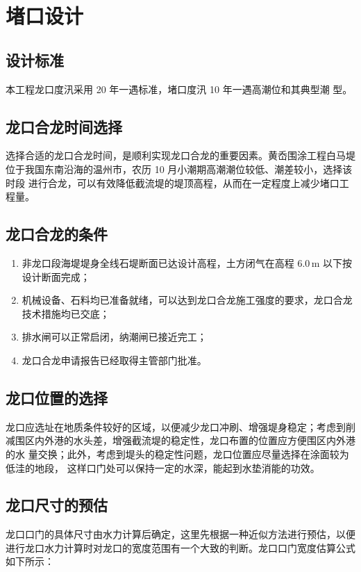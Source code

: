 \documentclass[UTF8, a4paper, 12pt]{ctexart} %
\begin{document}
\section{堵口设计}
\subsection{设计标准}
本工程龙口度汛采用 20 年一遇标准，堵口度汛 10 年一遇高潮位和其典型潮
型。
\subsection{龙口合龙时间选择}
选择合适的龙口合龙时间，是顺利实现龙口合龙的重要因素。黄岙围涂工程白马堤
位于我国东南沿海的温州市，农历 10 月小潮期高潮潮位较低、潮差较小，选择该时段
进行合龙，可以有效降低截流堤的堤顶高程，从而在一定程度上减少堵口工程量。



\subsection{龙口合龙的条件}

\begin{enumerate}
    \item 非龙口段海堤堤身全线石堤断面已达设计高程，土方闭气在高程 $6.0\,\text{m}$ 以下按设计断面完成；
    \item 机械设备、石料均已准备就绪，可以达到龙口合龙施工强度的要求，龙口合龙技术措施均已交底；
    \item 排水闸可以正常启闭，纳潮闸已接近完工；
    \item 龙口合龙申请报告已经取得主管部门批准。
\end{enumerate}

\subsection{龙口位置的选择}
龙口应选址在地质条件较好的区域，以便减少龙口冲刷、增强堤身稳定；考虑到削
减围区内外港的水头差，增强截流堤的稳定性，龙口布置的位置应方便围区内外港的水
量交换；此外，考虑到堤头的稳定性问题，龙口位置应尽量选择在涂面较为低洼的地段，
这样口门处可以保持一定的水深，能起到水垫消能的功效。
\subsection{龙口尺寸的预估}


龙口口门的具体尺寸由水力计算后确定，这里先根据一种近似方法进行预估，以便进行龙口水力计算时对龙口的宽度范围有一个大致的判断。龙口口门宽度估算公式如下所示：
\end{document}
